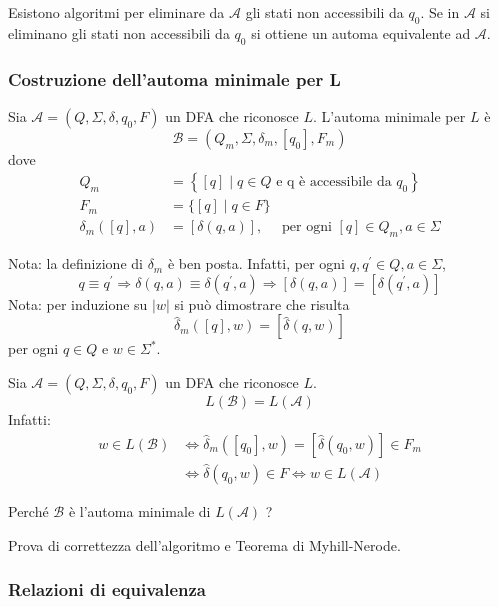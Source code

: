 Esistono algoritmi per eliminare da $\mathcal{A}$ gli stati non accessibili da $q_{0}$. Se in $\mathcal{A}$ si eliminano gli stati non accessibili da $q_{0}$ si ottiene un automa equivalente ad $\mathcal{A}$.

\subsubsection{Costruzione dell'automa minimale per L}

Sia $\mathcal{A}=\left(Q, \Sigma, \delta, q_{0}, F\right)$ un DFA che riconosce $L$. L'automa minimale per $L$ è
$$
\mathcal{B}=\left(Q_{m}, \Sigma, \delta_{m},\left[q_{0}\right], F_{m}\right)
$$
dove
$$
\begin{aligned}
Q_{m} &=\left\{[q] \mid q \in Q \text { e q è accessibile da } q_{0}\right\} \\
F_{m} &=\{[q] \mid q \in F\} \\
\delta_{m}([q], a) &=[\delta(q, a)], \quad \text { per ogni }[q] \in Q_{m}, a \in \Sigma
\end{aligned}
$$

Nota: la definizione di $\delta_{m}$ è ben posta.
Infatti, per ogni $q, q^{\prime} \in Q, a \in \Sigma$,
$$
q \equiv q^{\prime} \Rightarrow \delta(q, a) \equiv \delta\left(q^{\prime}, a\right) \Rightarrow[\delta(q, a)]=\left[\delta\left(q^{\prime}, a\right)\right]
$$
Nota: per induzione su $|w|$ si può dimostrare che risulta
$$
\hat{\delta}_{m}([q], w)=[\hat{\delta}(q, w)]
$$
per ogni $q \in Q$ e $w \in \Sigma^{*}$.

\vspace{5mm}

Sia $\mathcal{A}=\left(Q, \Sigma, \delta, q_{0}, F\right)$ un DFA che riconosce $L$.
$$
L(\mathcal{B})=L(\mathcal{A})
$$
Infatti:
$$
\begin{aligned}
w \in L(\mathcal{B}) & \Leftrightarrow \hat{\delta}_{m}\left(\left[q_{0}\right], w\right)=\left[\hat{\delta}\left(q_{0}, w\right)\right] \in F_{m} \\
& \Leftrightarrow \hat{\delta}\left(q_{0}, w\right) \in F \Leftrightarrow w \in L(\mathcal{A})
\end{aligned}
$$

Perché $\mathcal{B}$ è l'automa minimale di $L(\mathcal{A})$ ?

Prova di correttezza dell'algoritmo e Teorema di Myhill-Nerode.

\subsubsection{Relazioni di equivalenza}

